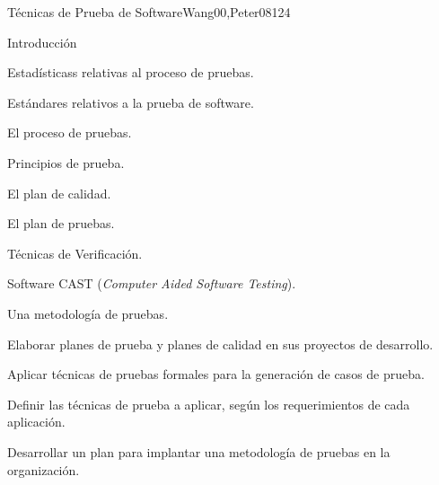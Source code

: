 \begin{syllabus}
\begin{unit}{Técnicas de Prueba de Software}{Wang00,Peter08}{12}{4}
\begin{topics}
      \item Introducción
      \item Estadísticass relativas al proceso de pruebas.
      \item Estándares relativos a la prueba de software.
      \item El proceso de pruebas.
      \begin{inparaenum}
         \item Principios de prueba.
         \item El plan de calidad.
         \item El plan de pruebas.
         \item Técnicas de Verificación.
      \end{inparaenum}
      \item Software CAST (\textit{Computer Aided Software Testing}).
      \item Una metodología de pruebas.
   \end{topics}

   \begin{learningoutcomes}
      \item Elaborar planes de prueba y planes de calidad en sus proyectos de desarrollo.
      \item Aplicar técnicas de pruebas formales para la generación de casos de prueba.
      \item Definir las técnicas de prueba a aplicar, según los requerimientos de cada aplicación.
      \item Desarrollar un plan para implantar una metodología de pruebas en la organización.
   \end{learningoutcomes}
\end{unit}



\begin{coursebibliography}
\end{coursebibliography}

\end{syllabus}
